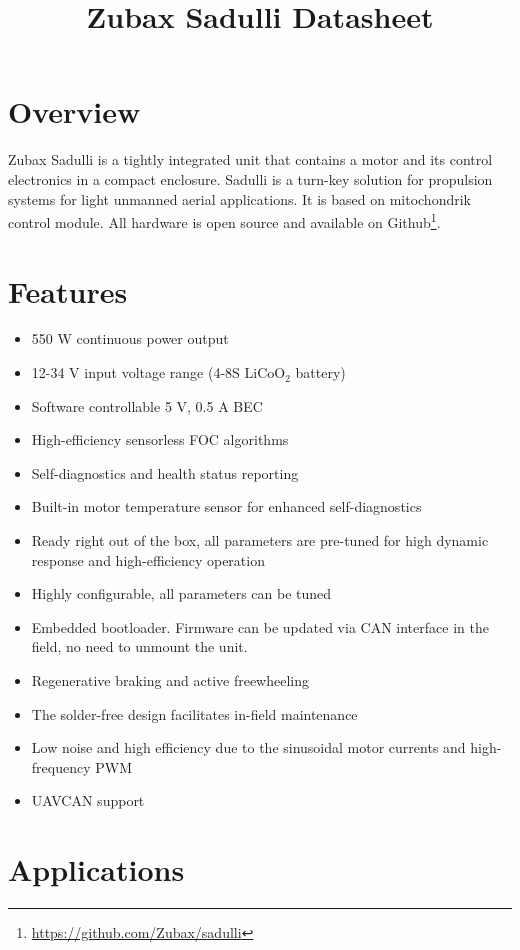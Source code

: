 \documentclass{document_templates/documentation_template_latex/zubaxdoc}
\title{Zubax Sadulli Datasheet}
\begin{document}
\frontmatter
\begin{titlepage}

\section*{Overview}

Zubax Sadulli is a tightly integrated unit that contains a motor and its control electronics in a compact enclosure. Sadulli is a turn-key solution for propulsion systems for light unmanned aerial applications. It is based on \mbox{mitochondrik} control module. All hardware is open source and available on Github\footnote{\url{https://github.com/Zubax/sadulli}}.

\section*{Features}

\begin{itemize}
    \item 550 W continuous power output
    \item 12-34 V input voltage range (4-8S $\text{LiCoO}_\text{2}$ battery)
    \item Software controllable 5 V, 0.5 A BEC
    \item High-efficiency sensorless FOC algorithms
    \item Self-diagnostics and health status reporting
    \item Built-in motor temperature sensor for enhanced self-diagnostics
    \item Ready right out of the box, all parameters are pre-tuned for high dynamic response and high-efficiency operation
    \item Highly configurable, all parameters can be tuned
    \item Embedded bootloader. Firmware can be updated via CAN interface in the field, no need to unmount the unit.
    \item Regenerative braking and active freewheeling
    \item The solder-free design facilitates in-field maintenance
    \item Low noise and high efficiency due to the sinusoidal \mbox{motor} currents and high-frequency PWM
    \item UAVCAN support
\end{itemize}

\section*{Applications}


\end{titlepage}
\end{document}
